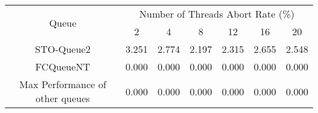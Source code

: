\begin{tabular}{|c|c|c|c|c|c|c|}
\hline
\multirow{2}{*}{Queue} & \multicolumn{6}{c|}{Number of Threads Abort Rate (\%)}\\\cline{2-7}& 2 & 4 & 8 & 12 & 16 & 20\\
\hline
\hline
STO-Queue2 & 3.251 & 2.774 & 2.197 & 2.315 & 2.655 & 2.548\\
FCQueueNT & 0.000 & 0.000 & 0.000 & 0.000 & 0.000 & 0.000\\
Max Performance of other queues & 0.000 & 0.000 & 0.000 & 0.000 & 0.000 & 0.000\\
\hline\end{tabular}
